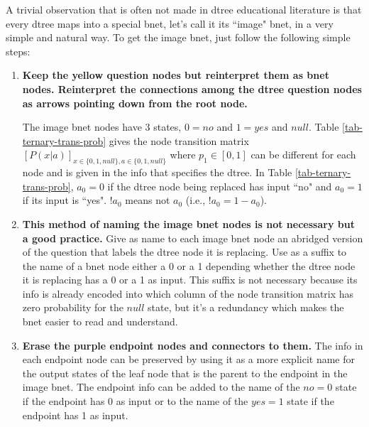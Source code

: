 A trivial 
observation
that is often not made
in dtree educational literature
is that every dtree 
maps into a special bnet, 
let's call it
its ``image" bnet,
in a very simple and natural way.
To get the
 image bnet, just follow the
following simple steps:
\begin{enumerate}
\item {\bf Keep
the yellow question nodes
but reinterpret them as bnet nodes.
Reinterpret the connections among
the dtree question nodes
 as arrows pointing
down from the root node.}

The image bnet nodes
have 3 states,  $0=no$ and
$1=yes$ and $null$.
Table \ref{tab-ternary-trans-prob}
gives the 
node transition matrix $[P(x|a)]_{
x\in \{0,1,null\}, 
a\in \{0,1,null\}}$
where $p_1\in[0,1]$ can be 
different for each node and is given
in the info that specifies    
the dtree. In Table 
\ref{tab-ternary-trans-prob},
$a_0= 0$ if the
dtree node being replaced has input
``no" and $a_0=1$ if its 
input is ``yes".
$!a_0$ means not $a_0$ (i.e., $!a_0=1-a_0$).
\item
{\bf This method of naming
the image bnet nodes
is not necessary but a good practice.}
Give as name to each image bnet
node 
an abridged 
version of
the question
that labels the dtree node it is replacing.
Use as a suffix
to the name of a 
bnet node either a 0 or a 1
depending whether
the dtree node it is replacing
has a 0 or a 1 as input.
This suffix is not
necessary because its
info is already encoded
into
which column
of the node transition matrix has 
zero probability for the
$null$ state, but
it's  a redundancy which makes
the bnet easier to read and understand.
\item {\bf Erase the purple endpoint
nodes and connectors to them.} The
info in each  endpoint node
can be preserved
by using it
as a more
explicit name
for the output
states of the
leaf node that 
is the parent
to the endpoint 
in the image bnet.
The
endpoint info can
be added to the name of
the $no=0$ state if the
endpoint has 0 as input 
or to the name
of the $yes=1$ state if 
the endpoint has 1 as input.
\end{enumerate}


